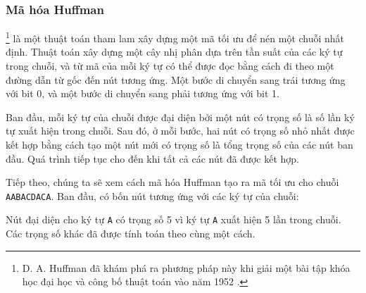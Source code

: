 
\subsubsection{Mã hóa Huffman}

\footnote{D. A. Huffman đã khám phá ra phương pháp này
khi giải một bài tập khóa học đại học
và công bố thuật toán vào năm 1952 \cite{huf52}.} là một thuật toán tham lam
xây dựng một mã tối ưu để
nén một chuỗi nhất định.
Thuật toán xây dựng một cây nhị phân
dựa trên tần suất của các ký tự
trong chuỗi,
và từ mã của mỗi ký tự có thể được đọc
bằng cách đi theo một đường dẫn từ gốc đến
nút tương ứng.
Một bước di chuyển sang trái tương ứng với bit 0,
và một bước di chuyển sang phải tương ứng với bit 1.

Ban đầu, mỗi ký tự của chuỗi được
đại diện bởi một nút có trọng số là
số lần ký tự xuất hiện trong chuỗi.
Sau đó, ở mỗi bước, hai nút có trọng số nhỏ nhất
được kết hợp bằng cách tạo
một nút mới có trọng số là tổng trọng số
của các nút ban đầu.
Quá trình tiếp tục cho đến khi tất cả các nút đã được kết hợp.

Tiếp theo, chúng ta sẽ xem cách mã hóa Huffman tạo ra
mã tối ưu cho chuỗi
\texttt{AABACDACA}.
Ban đầu, có bốn nút tương ứng
với các ký tự của chuỗi:

\begin{center}
\end{center}
Nút đại diện cho ký tự \texttt{A}
có trọng số 5 vì ký tự \texttt{A}
xuất hiện 5 lần trong chuỗi.
Các trọng số khác đã được tính toán
theo cùng một cách.

